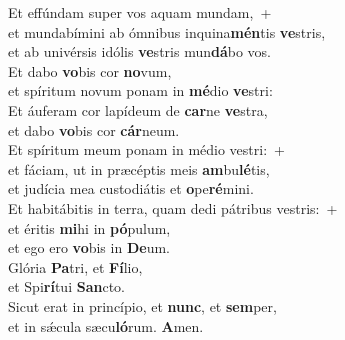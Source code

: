 \evenverse Et effúndam super vos aquam mundam,~+\\\evenverse  et mundabímini ab ómnibus inquina\textbf{mén}tis \textbf{ve}stris,~\*\\
\evenverse et ab univérsis idólis \textbf{ve}stris mun\textbf{dá}bo vos.\\
\oddverse Et dabo \textbf{vo}bis cor \textbf{no}vum,~\*\\
\oddverse et spíritum novum ponam in \textbf{mé}dio \textbf{ve}stri:\\
\evenverse Et áuferam cor lapídeum de \textbf{car}ne \textbf{ve}stra,~\*\\
\evenverse et dabo \textbf{vo}bis cor \textbf{cár}neum.\\
\oddverse Et spíritum meum ponam in médio vestri:~+\\
\oddverse  et fáciam, ut in præcéptis meis \textbf{am}bu\textbf{lé}tis,~\*\\
\oddverse et judícia mea custodiátis et \textbf{o}pe\textbf{ré}mini.\\
\evenverse Et habitábitis in terra, quam dedi pátribus vestris:~+\\
\evenverse  et éritis \textbf{mi}hi in \textbf{pó}pulum,~\*\\
\evenverse et ego ero \textbf{vo}bis in \textbf{De}um.\\
\oddverse Glória \textbf{Pa}tri, et \textbf{Fí}lio,~\*\\
\oddverse et Spi\textbf{rí}tui \textbf{San}cto.\\
\evenverse Sicut erat in princípio, et \textbf{nunc}, et \textbf{sem}per,~\*\\
\evenverse et in sǽcula sæcu\textbf{ló}rum. \textbf{A}men.\\

